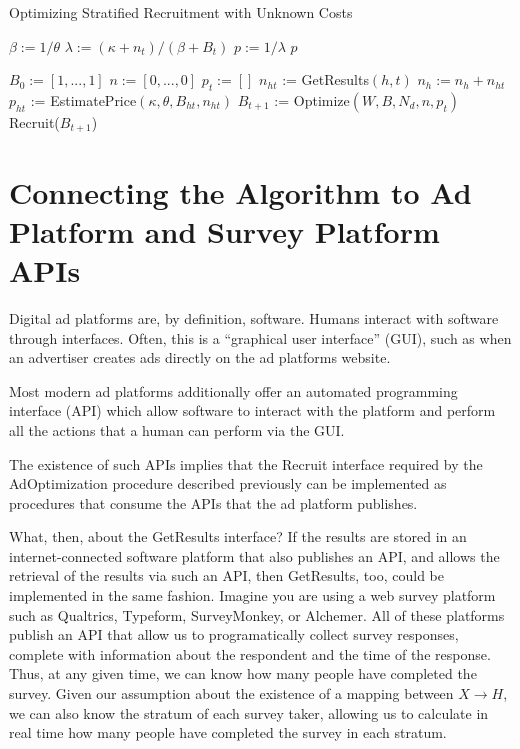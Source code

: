 \documentclass[a4paper,12pt]{article}
\theoremstyle{proposition}
\begin{document}
\begin{algorithm}
\caption{Optimizing Stratified Recruitment with Unknown Costs}
\begin{algorithmic}
 
\State $\beta := 1 / \theta$
\State $\lambda := (\kappa + n_t) / (\beta + B_t) $
\State $p := 1 / \lambda $
\State \Return $p$
\EndProcedure

\State $B_0 := [1,...,1]$ 
\State $n := [0,...,0]$ 
  \State $p_t := []$ 
    \State $n_{ht}$ := GetResults$(h, t)$
    \State $n_h := n_h + n_{ht}$
    \State $p_{ht}$ := EstimatePrice$(\kappa, \theta, B_{ht}, n_{ht})$
  \EndFor
  \State $B_{t+1}$ := Optimize$(W, B, N_d, n, p_t)$
  \State Recruit($B_{t+1}$)
\EndFor
\EndProcedure
\end{algorithmic}
\end{algorithm}


\section{Connecting the Algorithm to Ad Platform and Survey Platform APIs}

Digital ad platforms are, by definition, software. Humans interact with software through interfaces. Often, this is a ``graphical user interface'' (GUI), such as when an advertiser creates ads directly on the ad platforms website.

Most modern ad platforms additionally offer an automated programming interface (API) which allow software to interact with the platform and perform all the actions that a human can perform via the GUI.

The existence of such APIs implies that the Recruit interface required by the AdOptimization procedure described previously can be implemented as procedures that consume the APIs that the ad platform publishes.

What, then, about the GetResults interface? If the results are stored in an internet-connected software platform that also publishes an API, and allows the retrieval of the results via such an API, then GetResults, too, could be implemented in the same fashion. Imagine you are using a web survey platform such as Qualtrics, Typeform, SurveyMonkey, or Alchemer. All of these platforms publish an API that allow us to programatically collect survey responses, complete with information about the respondent and the time of the response. Thus, at any given time, we can know how many people have completed the survey. Given our assumption about the existence of a mapping between $X \rightarrow H$, we can also know the stratum of each survey taker, allowing us to calculate in real time how many people have completed the survey in each stratum.
\end{document}
